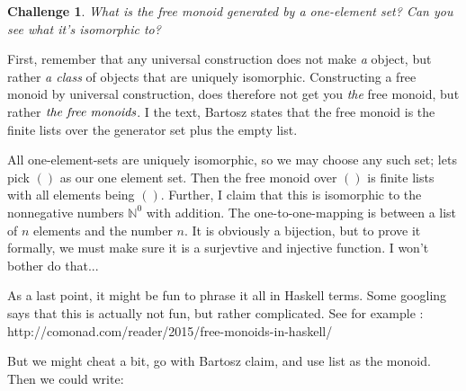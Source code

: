 \documentclass{article}
\newcommand\nat{\mathbb{N}}
\theoremstyle{definition}
\newtheorem{ch}{Challenge}
\begin{document}
\begin{ch}\textit{What is the free monoid generated by a one-element set? Can you see what it’s isomorphic to?}

First, remember that any universal construction does not make \emph{a} object, but rather \emph{a class} of objects that are uniquely isomorphic. Constructing a free monoid by universal construction, does therefore not get you \emph{the} free monoid, but rather $\emph{the free monoids}$. I the text, Bartosz states that the free monoid is the finite lists over the generator set plus the empty list. 

All one-element-sets are uniquely isomorphic, so we may choose any such set; lets pick ${()}$ as our one element set. Then the free monoid over ${()}$ is finite lists with all elements being $()$. Further, I claim that this is isomorphic to the nonnegative numbers $\nat ^0$ with addition. The one-to-one-mapping is between a list of $n$ elements and the number $n$. It is obviously a bijection, but to prove it formally, we must make sure it is a surjevtive and injective function. I won't bother do that...

As a last point, it might be fun to phrase it all in Haskell terms. Some googling says that this is actually not fun, but rather complicated. See for example : http://comonad.com/reader/2015/free-monoids-in-haskell/ 

But we might cheat a bit, go with Bartosz claim, and use list as the monoid. Then we could write:





\end{ch}
\end{document}
